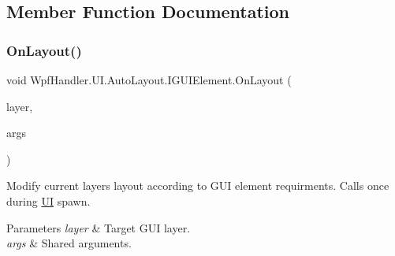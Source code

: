 \subsection{Member Function Documentation}
\mbox{\label{interface_wpf_handler_1_1_u_i_1_1_auto_layout_1_1_i_g_u_i_element_a0ff16956f8e8187d51e1b36b6b9f894e}} 
\subsubsection{\texorpdfstring{On\+Layout()}{OnLayout()}}
{\footnotesize\ttfamily void Wpf\+Handler.\+U\+I.\+Auto\+Layout.\+I\+G\+U\+I\+Element.\+On\+Layout (\begin{DoxyParamCaption}\item[{ref \mbox{\hyperlink{class_wpf_handler_1_1_u_i_1_1_auto_layout_1_1_layout_layer}{Layout\+Layer}}}]{layer,  }\item[{params object \mbox{[}$\,$\mbox{]}}]{args }\end{DoxyParamCaption})}



Modify current layer\textquotesingle{}s layout according to G\+UI element requirments. Calls once during \mbox{\hyperlink{namespace_wpf_handler_1_1_u_i}{UI}} spawn. 


\begin{DoxyParams}{Parameters}
{\em layer} & Target G\+UI layer.\\
\hline
{\em args} & Shared arguments.\\
\hline
\end{DoxyParams}


